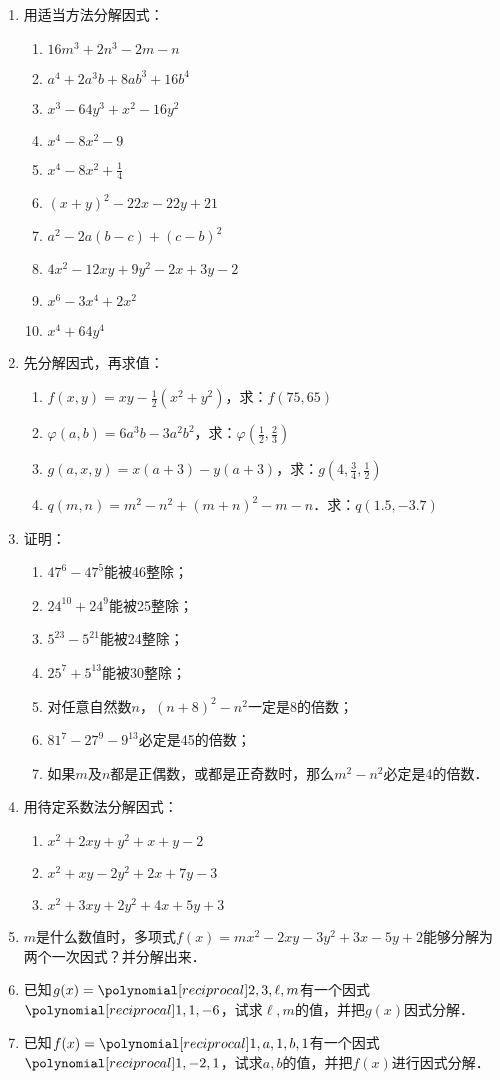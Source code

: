 \begin{enumerate}
    \item 用适当方法分解因式：
    \begin{multicols}{2}
\begin{enumerate}
    \item $16m^3+2n^3-2m-n$
    \item $a^4+2a^3b+8ab^3+16b^4$
    \item $x^3-64y^3+x^2-16y^2$
    \item $x^4-8x^2-9$
    \item $x^4-8x^2+\frac{1}{4}$
    \item $(x+y)^2-22x-22y+21$
    \item $a^2-2a(b-c)+(c-b)^2$
    \item $4x^2-12xy+9y^2-2x+3y-2$
    \item $x^6-3x^4+2x^2$
    \item $x^4+64y^4$
\end{enumerate}
\end{multicols}
    \item 先分解因式，再求值：
\begin{enumerate}
    \item $f(x,y)=xy-\frac{1}{2}(x^2+y^2)$，求：$f(75,65)$
    \item $\varphi(a,b)=6a^3b-3a^2b^2$，求：$\varphi\left(\frac{1}{2},\frac{2}{3}\right)$    
    \item $g(a,x,y)=x(a+3)-y(a+3)$，求：$g\left(4,\frac{3}{4},\frac{1}{2}\right)$
    \item $q(m,n)=m^2-n^2+(m+n)^2-m-n$．求：$q(1.5,-3.7)$
\end{enumerate}
    \item 证明：
\begin{enumerate}
    \item $47^6-47^5$能被46整除；
    \item $24^{10}+24^9$能被25整除；
    \item $5^{23}-5^{21}$能被24整除；
    \item $25^7+5^{13}$能被30整除；
    \item 对任意自然数$n$，$(n+8)^2-n^2$一定是8的倍数；
    \item $81^7-27^9-9^{13}$必定是45的倍数；
    \item 如果$m$及$n$都是正偶数，或都是正奇数时，那么$m^2-n^2$必定是4的倍数．
\end{enumerate}
    \item 用待定系数法分解因式：
    \begin{enumerate}
    \item $x^2+2xy+y^2+x+y-2$
    \item $x^2+xy-2y^2+2x+7y-3$
    \item $x^2+3xy+2y^2+4x+5y+3$
\end{enumerate}
    \item $m$是什么数值时，多项式$f(x)=mx^2-2xy-3y^2+3x-5y+2$能够分解为两个一次因式？并分解出来．
    \item 已知$g(x)=\poly{2,3,\ell,m}$有一个因式$\poly{1,1,-6}$，试求$\ell,m$的值，并把$g(x)$因式分解．
    \item 已知$f(x)=\poly{1,a,1,b,1}$有一个因式$\poly{1,-2,1}$，试求$a,b$的值，并把$f(x)$进行因式分解．
\end{enumerate}

